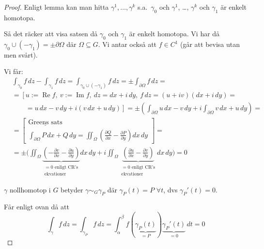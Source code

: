\begin{proof}
Enligt lemma kan man hitta $\gamma^1, \dots, \gamma^k$ s.a.\ $\gamma_0$ och $\gamma^1$, \dots, $\gamma^k$ och $\gamma_1$ är enkelt homotopa.

Så det räcker att visa satsen då $\gamma_0$ och $\gamma_1$ är enkelt homotopa. Vi har då $\gamma_0 \cup (-\gamma_1) = \pm\partial\Omega$ där $\Omega \subseteq G$.
Vi antar också att $f \in C^1$ (går att bevisa utan men svårt).

Vi får:
\begin{align*}
&\int_{\gamma_0} f\,dz - \int_{\gamma_1} f\,dz = \int_{\gamma_0 \cup (-\gamma_1)} f\,dz = \pm\int_{\partial\Omega} f\,dz = \\
&= \left[ u := \operatorname{Re} f,\ v := \operatorname{Im} f,\ dz = dx + i\,dy,\ f\,dz = (u + iv)(dx + i\,dy) = \right. \\
&\qquad \left. = u\,dx - v\,dy + i(v\,dx + u\,dy) \right] = \pm\left( \int_{\partial\Omega} u\,dx - v\,dy + i\int_{\partial\Omega} v\,dx + u\,dy \right) = \\
&= \left[ \begin{array}{l} \underline{\text{Greens sats}} \\ \displaystyle\int_{\partial\Omega} P\,dx + Q\,dy = \iint_\Omega \left( \frac{\partial Q}{\partial x} - \frac{\partial P}{\partial y} \right) dx\,dy \end{array} \right] = \\
&= \pm\Bigg( \iint_\Omega \underbrace{\left( -\frac{\partial v}{\partial x} - \frac{\partial u}{\partial y} \right)}_{\substack{= 0 \text{ enligt CR's} \\ \text{ekvationer}}} dx\,dy + i\iint_\Omega \underbrace{\left( \frac{\partial u}{\partial x} - \frac{\partial v}{\partial y} \right)}_{\substack{= 0 \text{ enligt CR's} \\ \text{ekvationer}}} dx\,dy \Bigg) = 0
\end{align*}

$\gamma$ nollhomotop i $G$ betyder $\gamma \sim_G \gamma_P$ där $\gamma_P(t) = P$ $\forall t$, dvs $\gamma_P'(t) = 0$.

Får enligt ovan då att
\[ \int_\gamma f\,dz = \int_{\gamma_P} f\,dz = \int_\alpha^\beta f(\underbrace{\gamma_P(t)}_{= P})\underbrace{\gamma_P'(t)}_{= 0}\,dt = 0 \]
\end{proof}
